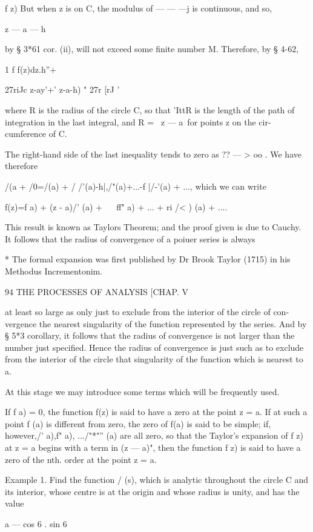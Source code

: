 {{f z) But when z is on C, the modulus of — — —j is continuous, and so,

z — a — h

by § 3*61 cor. (ii), will not exceed some finite number M. Therefore,
by § 4-62,

1 f f(z)dz.h''+

27riJc z-ay'+' z-a-h) " 27r [rJ '

where R is the radius of the circle C, so that 'IttR is the length of
the path of integration in the last integral, and R = \ z — a\ for
points z on the cir- cumference of C.

The right-hand side of the last inequality tends to zero as ?? — > oo
. We have therefore

/(a + /0=/(a) + / /'(a)-h|,/"(a)+...-f |/-'(a) + ..., which we can
write

f(z)=f a) + (z - a)/' (a) + ~ ~ff" a) + ... + ri /< ) (a) + ....

This result is known as Taylors Theorem; and the proof given is due
to Cauchy. It follows that the radius of convergence of a poiuer
series is always

* The formal expansion was first published by Dr Brook Taylor (1715)
in his Methodus Incrementonim.

94 THE PROCESSES OF ANALYSIS [CHAP. V

at least so large as only just to exclude from the interior of the
circle of con- vergence the nearest singularity of the function
represented by the series. And by § 5*3 corollary, it follows that the
radius of convergence is not larger than the number just specified.
Hence the radius of convergence is just such as to exclude from the
interior of the circle that singularity of the function which is
nearest to a.

At this stage we may introduce some terms which will be frequently
used.

If f a) = 0, the function f(z) is said to have a zero at the point z =
a. If at such a point f (a) is different from zero, the zero of f(a)
is said to be simple; if, however,/' a),f" a), .../"*"'' (a) are all
zero, so that the Taylor's expansion of f z) at z = a begins with a
term in (z — a)", then the function f z) is said to have a zero of the
nth. order at the point z = a.

Example 1. Find the function / (s), which is analytic throughout the
circle C and its interior, whose centre is at the origin and whose
radius is unity, and has the value

a — cos 6 . sin 6

}}
